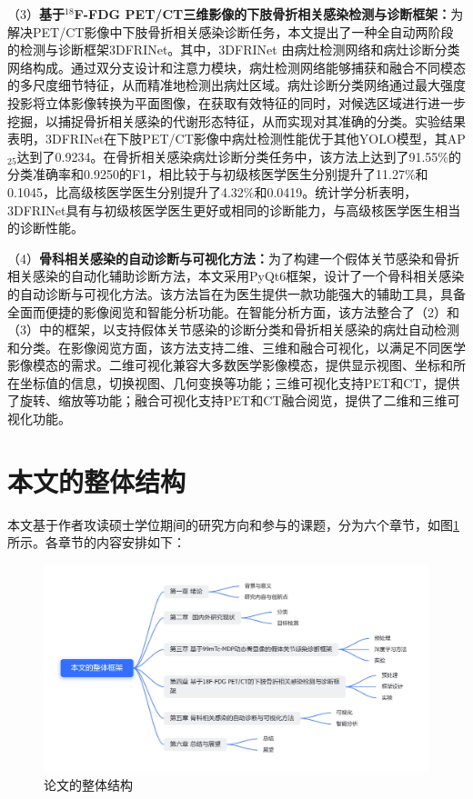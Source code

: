 （3）\textbf{基于\(^{18}\)F-FDG PET/CT三维影像的下肢骨折相关感染检测与诊断框架：}为解决PET/CT影像中下肢骨折相关感染诊断任务，本文提出了一种全自动两阶段的检测与诊断框架3DFRINet。其中，3DFRINet 由病灶检测网络和病灶诊断分类网络构成。通过双分支设计和注意力模块，病灶检测网络能够捕获和融合不同模态的多尺度细节特征，从而精准地检测出病灶区域。病灶诊断分类网络通过最大强度投影将立体影像转换为平面图像，在获取有效特征的同时，对候选区域进行进一步挖掘，以捕捉骨折相关感染的代谢形态特征，从而实现对其准确的分类。实验结果表明，3DFRINet在下肢PET/CT影像中病灶检测性能优于其他YOLO模型，其AP\(_{25}\)达到了0.9234。在骨折相关感染病灶诊断分类任务中，该方法上达到了91.55\%的分类准确率和0.9250的F1，相比较于与初级核医学医生分别提升了11.27\%和0.1045，比高级核医学医生分别提升了4.32\%和0.0419。统计学分析表明，3DFRINet具有与初级核医学医生更好或相同的诊断能力，与高级核医学医生相当的诊断性能。

（4）\textbf{骨科相关感染的自动诊断与可视化方法：}为了构建一个假体关节感染和骨折相关感染的自动化辅助诊断方法，本文采用PyQt6框架，设计了一个骨科相关感染的自动诊断与可视化方法。该方法旨在为医生提供一款功能强大的辅助工具，具备全面而便捷的影像阅览和智能分析功能。在智能分析方面，该方法整合了（2）和（3）中的框架，以支持假体关节感染的诊断分类和骨折相关感染的病灶自动检测和分类。在影像阅览方面，该方法支持二维、三维和融合可视化，以满足不同医学影像模态的需求。二维可视化兼容大多数医学影像模态，提供显示视图、坐标和所在坐标值的信息，切换视图、几何变换等功能；三维可视化支持PET和CT，提供了旋转、缩放等功能；融合可视化支持PET和CT融合阅览，提供了二维和三维可视化功能。

\section{本文的整体结构}

本文基于作者攻读硕士学位期间的研究方向和参与的课题，分为六个章节，如图\ref{fig:chap01_structure}所示。各章节的内容安排如下：

\begin{figure}[htbp]
  \centering
  \includegraphics[width=\textwidth]{figures/chap01_structure_light.jpg}
  \caption{论文的整体结构}
  \label{fig:chap01_structure}
\end{figure}


